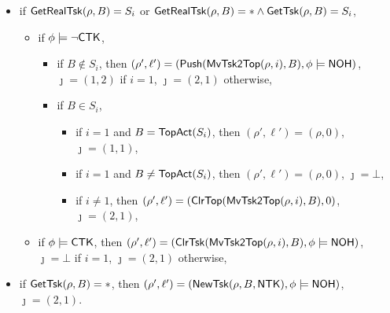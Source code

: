 {
\begin{itemize}
	\item if $\mathsf{GetRealTsk}(\rho, B) = S_i$ 
	or $ \mathsf{GetRealTsk}(\rho, B) = * \wedge \mathsf{GetTsk}(\rho, B) = S_i$, 
	\begin{itemize}
		\item if $\phi \models \neg {\sf CTK} $, 
		\begin{itemize}
			\item if $B \not \in S_i$, then $(\rho',\ell') = (\mathsf{Push}(\mathsf{MvTsk2Top}(\rho,i),B),\phi\models{\sf NOH})$, $\jmath = (1,2)$ if $i = 1$, $\jmath = (2,1)$ otherwise,
			\item if $B \in S_i$, 	
			\begin{itemize}
				\item if $i = 1$ and $B = \mathsf{TopAct}(S_i)$, then $(\rho',\ell') = (\rho,0)$, $\jmath = (1,1)$,
				\item if $i = 1$ and $B \neq \mathsf{TopAct}(S_i)$, then $(\rho',\ell') = (\rho,0)$, $\jmath = \bot$,
				\item if $i \neq 1$, then $(\rho',\ell') = (\mathsf{ClrTop}(\mathsf{MvTsk2Top}(\rho,i),B), 0)$, $\jmath = (2,1)$,
			\end{itemize}
		\end{itemize}
		\item if $\phi \models {\sf CTK}$, then $(\rho',\ell') = (\mathsf{ClrTsk}(\mathsf{MvTsk2Top}(\rho, i), B),\phi\models{\sf NOH})$, $\jmath = \bot$ if $i = 1$, $\jmath = (2,1)$ otherwise,
	\end{itemize}
\item if $\mathsf{GetTsk}(\rho, B) = *$, then $(\rho',\ell') = (\mathsf{NewTsk}(\rho, B, {\sf NTK}),\phi\models{\sf NOH})$, $\jmath = (2,1)$.
\end{itemize}

}
